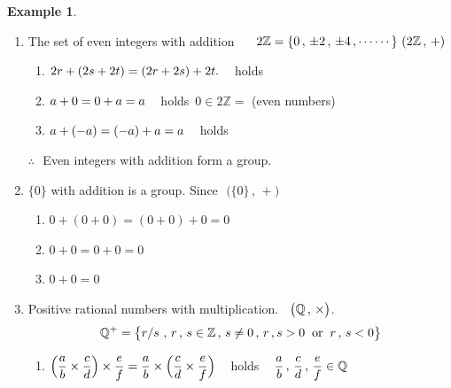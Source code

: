 \documentclass[11pt,a4paper]{article}
\theoremstyle{definition}
\newtheorem{exa}[thm]{Example}
\begin{document}
\begin{exa}
\begin{enumerate}
\item The set of even integers with addition $\hspace{0.5cm}2\mathbb{Z} = \{0\, ,\, \pm 2\, , \, \pm 4\, , \cdots\cdots\}\,\, (2\mathbb{Z}\, ,\, +)$
\begin{enumerate}
       \item[(i)] $2r + (2s + 2t) = (2r + 2s) + 2t.\hspace{0.3cm}$ holds
       \item[(ii)] $a+ 0 = 0 + a = a\hspace{0.3cm}$ holds $\, 0\in 2\mathbb{Z}=$ (even numbers)
       \item[(iii)] $a + (-a) = (-a) + a  = a\hspace{0.3cm}$ holds
\end{enumerate}
$\therefore\,\, $ Even integers with addition form a group.\\



\item $\{0\}$ with addition is a group. Since $\, \, \big(\{0\}\, , \, +\big)$
\begin{enumerate}
       \item[(i)] $0 + (0 + 0) = (0 + 0) + 0 = 0$
       \item[(ii)] $ 0 + 0 = 0 +  0 = 0$
       \item[(iii)] $0 + 0 = 0$\\
\end{enumerate}



\item Positive rational numbers with multiplication. $\hspace{0.2cm}\big(\mathbb{Q}\, , \, \times\big)$.
$$\mathbb{Q}^+ = \big\{r/s\, \, , \, r\, , \, s\in \mathbb{Z}\, , \, s\neq 0\, , \, r\, , s>0\hspace{0.2cm}\text{or}\hspace{0.2cm} r\, , \, s<0\big\}$$
\begin{enumerate}
      \item[(i)] $\Big(\dfrac{a}{b}\times \dfrac{c}{d}\Big)\times\dfrac{e}{f} =\dfrac{a}{b}\times \Big(\dfrac{c}{d}\times\dfrac{e}{f}\Big)\hspace{0.3cm}$ holds $\hspace{0.3cm}\dfrac{a}{b}\, , \, \dfrac{c}{d}\, , \, \dfrac{e}{f}\in \mathbb{Q}$\\
      

\end{enumerate}
\end{enumerate}
\end{exa}
\end{document}
